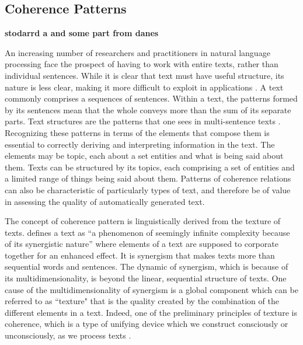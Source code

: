 \subsection{Coherence Patterns}
\textbf{stodarrd a and some part from danes}

An increasing number of researchers and practitioners in natural language processing face the prospect of having to work with entire texts, rather than individual sentences. 
While it is clear that text must have useful structure, its nature is less clear, making it more difficult to exploit in applications \cite{webber12a}. 
A text commonly comprises a sequences of sentences. 
Within a text, the patterns formed by its sentences mean that the whole conveys more than the sum of its separate parts. 
Text structures are the patterns that one sees in multi-sentence texts \cite{webber12a}. 
Recognizing these patterns in terms of the elements that compose them is essential to correctly deriving and interpreting information in the text. 
The elements may be topic, each  about a set entities and what is being said about them.
Texts can be structured by its topics, each comprising a set of entities and a limited range of things being said about them. 
Patterns of coherence relations can also be characteristic of particularly types of text, and therefore be of value in assessing the quality of automatically generated text. 

The concept of coherence pattern is linguistically derived from the texture of texts. 
 defines a text as ``a phenomenon of seemingly infinite complexity because of its synergistic nature'' where elements of a text are supposed to corporate together for an enhanced effect. 
It is synergism that makes texts more than sequential words and sentences. 
The dynamic of synergism, which is because of its multidimensionality, is beyond the linear, sequential structure of texts. 
One cause of the multidimensionality of synergism is a global component which can be referred to as ``texture" that is 
the quality created by the combination of the different elements in a text. 
Indeed, one of the preliminary principles of texture is coherence, which is a type of unifying device which we construct consciously or unconsciously, as we process texts \cite{stoddard91,halliday76}.

